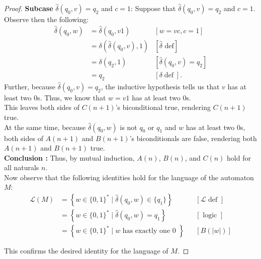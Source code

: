 \documentclass[10pt]{article}
\begin{document}
\begin{enumerate}[label={}]
\begin{proof}
                  \textbf{Subcase }$\hat{\delta}\left(q_0, v\right)=q_2$ and $c=1$: Suppose that $\hat{\delta}\left(q_0, v\right)=q_2$ and $c=1$. Observe then the following:
                  $$
                        \begin{aligned}
                              \hat{\delta}\left(q_0, w\right) & =\hat{\delta}\left(q_0, v 1\right)                    & {[w=v c, c=1] }                                     \\
                                                              & =\delta\left(\hat{\delta}\left(q_0, v\right),1\right) & {[\hat{\delta} \text { def}] }                      \\
                                                              & =\delta\left(q_2, 1\right)                            & {\left[\hat{\delta}\left(q_0, v\right)=q_2\right] } \\
                                                              & =q_2                                                  & {[\delta \operatorname{def}] . }
                        \end{aligned}
                  $$
                  Further, because $\hat{\delta}\left(q_0, v\right)=q_2$, the inductive hypothesis tells us that $v$ has at least two 0s. Thus, we know that $w=v1$ has at least two 0s.\\
                  This leaves both sides of $C(n+1)$'s biconditional true, rendering $C(n+1)$ true.\\
                  At the same time, because $\hat{\delta}\left(q_0, w\right)$ is not $q_0$ or $q_1$ and $w$ has at least two 0s, both sides of $A(n+1)$ and $B(n+1)$'s biconditionals are false, rendering both $A(n+1)$ and $B(n+1)$ true.\\

                  \textbf{Conclusion :} Thus, by mutual induction, $A(n)$, $B(n)$, and $C(n)$ hold for all naturals $n$.\\
                  Now observe that the following identities hold for the language of the automaton $M$:
                  $$
                        \begin{aligned}
                              \mathcal{L}(M) & =\left\{w \in\{0, 1\}^* \mid \hat{\delta}(q_0, w) \in\{q_1\}\right\} &  & {[\mathcal{L} \text { def }] } \\
                                             & =\left\{w \in\{0, 1\}^* \mid \hat{\delta}(q_0, w)=q_1\right\}        &  & {[\text { logic }] }           \\
                                             & =\left\{w \in\{0, 1\}^* \mid w \text { has exactly one 0 }\right\}   &  & {[B(|w|)] }
                        \end{aligned}
                  $$

                  This confirms the desired identity for the language of $M$.
            \end{proof}


\end{enumerate}
\end{document}
